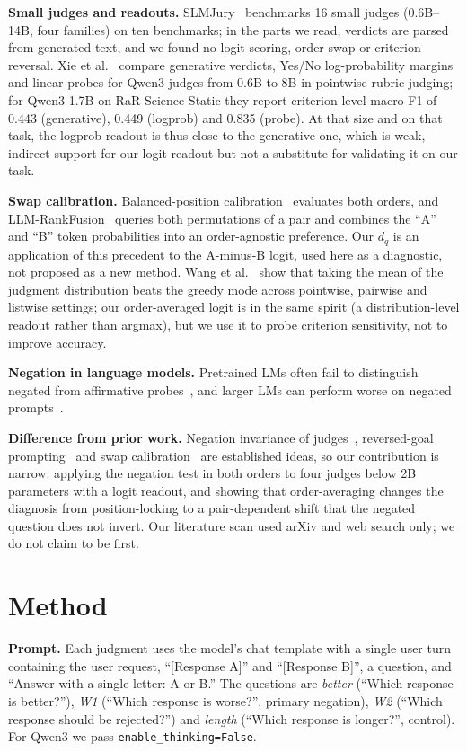 \documentclass[conference]{IEEEtran}
\begin{document}
\textbf{Small judges and readouts.} SLMJury~\cite{laddha2026slmjury} benchmarks 16 small judges
(0.6B--14B, four families) on ten benchmarks; in the parts we read, verdicts are parsed from generated text, and
we found no logit scoring, order swap or criterion reversal. Xie et al.~\cite{xie2026smallrubric} compare
generative verdicts, Yes/No log-probability margins and linear probes for Qwen3 judges from 0.6B to 8B in
pointwise rubric judging; for Qwen3-1.7B on RaR-Science-Static they report criterion-level macro-F1 of 0.443
(generative), 0.449 (logprob) and 0.835 (probe). At that size and on that task, the logprob readout is thus close
to the generative one, which is weak, indirect support for our logit readout but not a substitute for
validating it on our task.

\textbf{Swap calibration.} Balanced-position calibration~\cite{wang2023fair} evaluates both orders, and
LLM-RankFusion~\cite{zeng2024rankfusion} queries both permutations of a pair and combines the ``A'' and ``B''
token probabilities into an order-agnostic preference. Our $d_q$ is an application of this precedent to the
A-minus-B logit, used here as a diagnostic, not proposed as a new method.
Wang et al.~\cite{wang2025distribution} show that taking the mean of the judgment distribution beats the greedy mode
across pointwise, pairwise and listwise settings; our order-averaged logit is in the same spirit (a distribution-level
readout rather than argmax), but we use it to probe criterion sensitivity, not to improve accuracy.

\textbf{Negation in language models.} Pretrained LMs often fail to distinguish negated from affirmative
probes~\cite{kassner2020negated}, and larger LMs can perform worse on negated prompts~\cite{jang2022negated}.

\textbf{Difference from prior work.} Negation invariance of judges~\cite{liu2024aligning}, reversed-goal
prompting~\cite{song2025grp} and swap calibration~\cite{wang2023fair,zeng2024rankfusion} are established ideas,
so our contribution is narrow: applying the negation test in both orders to four judges below 2B parameters
with a logit readout, and showing that order-averaging changes the diagnosis from position-locking to a
pair-dependent shift that the negated question does not invert. Our literature scan used arXiv and web search
only; we do not claim to be first.

\section{Method}\label{sec:method}
\textbf{Prompt.} Each judgment uses the model's chat template with a single user turn containing the user
request, ``[Response A]'' and ``[Response B]'', a question, and ``Answer with a single letter: A or B.'' The
questions are \emph{better} (``Which response is better?''), \emph{W1} (``Which response is worse?'', primary
negation), \emph{W2} (``Which response should be rejected?'') and \emph{length} (``Which response is longer?'',
control). For Qwen3 we pass \texttt{enable\_thinking=False}.
\end{document}
